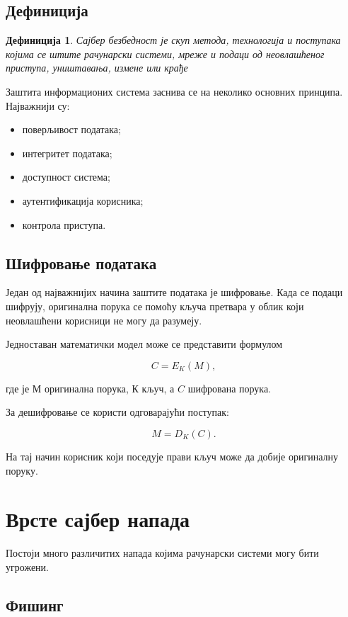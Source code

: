 \documentclass[12pt,a4paper]{article}
\newtheorem{definition}{Дефиниција}[section]
\begin{document}
\subsection{Дефиниција}
\begin{definition}
Сајбер безбедност је скуп метода, технологија и поступака којима се штите рачунарски системи, мреже и подаци од неовлашћеног приступа, уништавања, измене или крађе
\end{definition}

Заштита информационих система заснива се на неколико основних принципа.
Најважнији су:

\begin{itemize}
    \item поверљивост података;
    \item интегритет података;
    \item доступност система;
    \item аутентификација корисника;
    \item контрола приступа.
\end{itemize}

\subsection{Шифровање података}

Један од најважнијих начина заштите података је шифровање. Када се подаци шифрују, оригинална порука се помоћу кључа претвара у облик који неовлашћени корисници не могу да разумеју.

Једноставан математички модел може се представити формулом

\[
C=E_K(M),
\]

где је $М$ оригинална порука, $К$ кључ, а $C$ шифрована порука.

За дешифровање се користи одговарајући поступак:

\[
M=D_K(C).
\]

На тај начин корисник који поседује прави кључ може да добије оригиналну поруку.

\section{Врсте сајбер напада}

Постоји много различитих напада којима рачунарски системи могу бити угрожени.

\subsection{Фишинг}
\end{document}
